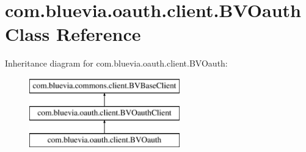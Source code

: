 \hypertarget{classcom_1_1bluevia_1_1oauth_1_1client_1_1BVOauth}{
\section{com.bluevia.oauth.client.BVOauth Class Reference}
\label{classcom_1_1bluevia_1_1oauth_1_1client_1_1BVOauth}
}
Inheritance diagram for com.bluevia.oauth.client.BVOauth:\begin{figure}[H]
\begin{center}
\leavevmode
\includegraphics[height=3.000000cm]{classcom_1_1bluevia_1_1oauth_1_1client_1_1BVOauth}
\end{center}
\end{figure}
